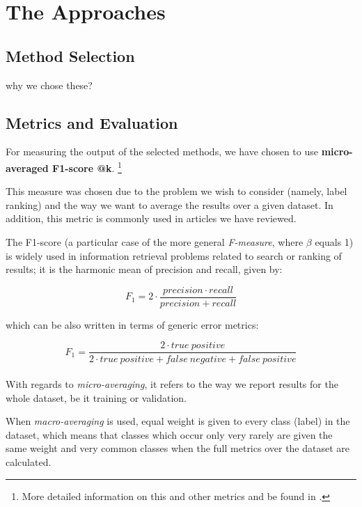\section{The Approaches}\label{section:datasets}

\subsection{Method Selection}

why we chose these?

\subsection{Metrics and Evaluation}

For measuring the output of the selected methods, we have chosen to use \textbf{micro-averaged F1-score @k}. \footnote{More detailed information on this and other metrics and be found in \cite{sokolova_and_napalme_2009}.}

This measure was chosen due to the problem we wish to consider (namely, label ranking) and the way we want to average the results over a given dataset. In addition, this metric is commonly used in articles we have reviewed.

The F1-score (a particular case of the more general \textit{F-measure}, where $\beta$ equals 1) is widely used in information retrieval problems related to search or ranking of results; it is the harmonic mean of precision and recall, given by:

\begin{equation}
F_1 = 2 \cdot \frac{precision \cdot recall}{precision + recall} 
\end{equation}

which can be also written in terms of generic error metrics:

\begin{equation}
F_1 = \frac{2 \cdot true \ positive}{2 \cdot true \ positive + false \ negative + false \ positive} 
\end{equation}\\

With regards to \textit{micro-averaging}, it refers to the way we report results for the whole dataset, be it training or validation.

When \textit{macro-averaging} is used, equal weight is given to every class (label) in the dataset, which means that classes which occur only very rarely are given the same weight and very common classes when the full metrics over the dataset are calculated.

